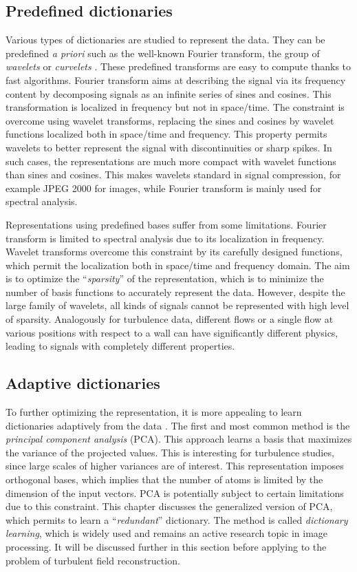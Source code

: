 \subsection{Predefined dictionaries}
Various types of dictionaries are studied to represent the data. They can be predefined \textit{a priori} such as the well-known Fourier transform, the group of \textit{wavelets} or \textit{curvelets} \citep{mallat1989theory,mallat1999wavelet}. These predefined transforms are easy to compute thanks to fast algorithms. Fourier transform aims at describing the signal via its frequency content by decomposing signals as an infinite series of sines and cosines. This transformation is localized in frequency but not in space/time. The constraint is overcome using wavelet transforms, replacing the sines and cosines by wavelet functions localized both in space/time and frequency. This property permits wavelets to better represent the signal with discontinuities or sharp spikes. In such cases, the representations are much more compact with wavelet functions than sines and cosines. This makes wavelets standard in signal compression, for example JPEG 2000 for images, while Fourier transform is mainly used for spectral analysis.

Representations using predefined bases suffer from some limitations. Fourier transform is limited to spectral analysis due to its localization in frequency. Wavelet transforms overcome this constraint by its carefully designed functions, which permit the localization both in space/time and frequency domain. The aim is to optimize the ``\textit{sparsity}'' of the representation, which is to minimize the number of basis functions to accurately represent the data. However, despite the large family of wavelets, all kinds of signals cannot be represented with high level of sparsity. Analogously for turbulence data, different flows or a single flow at various positions with respect to a wall can have significantly different physics, leading to signals with completely different properties.

\subsection{Adaptive dictionaries}
To further optimizing the representation, it is more appealing to learn dictionaries adaptively from the data \citep{bengio2013representation}. The first and most common method is the \textit{principal component analysis} (PCA). This approach learns a basis that maximizes the variance of the projected values. This is interesting for turbulence studies, since large scales of higher variances are of interest. This representation imposes orthogonal bases, which implies that the number of atoms is limited by the dimension of the input vectors. PCA is potentially subject to certain limitations due to this constraint. This chapter discusses the generalized version of PCA, which permits to learn a ``\textit{redundant}'' dictionary. The method is called \textit{dictionary learning}, which is widely used and remains an active research topic in image processing. It will be discussed further in this section before applying to the problem of turbulent field reconstruction. 

